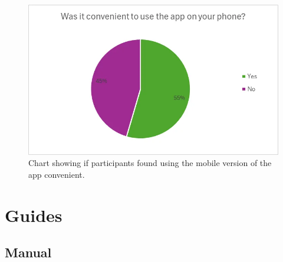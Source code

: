 \documentclass{l4proj}
\begin{document}
\begin{appendices}
\begin{figure}[H]
    \centering
    \includegraphics[width=0.75\linewidth]{images/Evaluation-Charts/phone-convenience.png}
    \caption{Chart showing if participants found using the mobile version of the app convenient.}
    \label{fig:enter-label}
\end{figure}

\chapter{Guides}
\section{Manual}


\end{appendices}





\renewcommand{\thechapter}{0}

\end{document}
